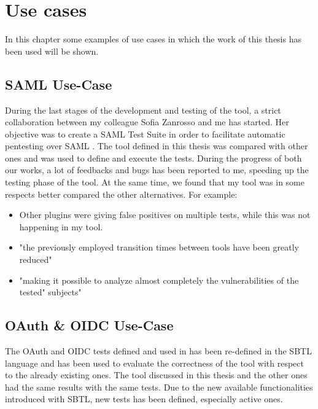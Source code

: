 \chapter{Use cases}
\label{chap:Use_cases}
In this chapter some examples of use cases in which the work of this thesis has been used will be shown.

\section{SAML Use-Case}
During the last stages of the development and testing of the tool, a strict collaboration between my colleague Sofia Zanrosso and me has started. Her objective was to create a SAML Test Suite in order to facilitate automatic pentesting over SAML \cite{sofia_zanrosso}. The tool defined in this thesis was compared with other ones and was used to define and execute the tests. During the progress of both our works, a lot of feedbacks and bugs has been reported to me, speeding up the testing phase of the tool. At the same time, we found that my tool was in some respects better compared the other alternatives. For example:
\begin{itemize}
    \item Other plugins were giving false positives on multiple tests, while this was not happening in my tool.
    \item "the previously employed transition times between tools have been greatly reduced"
    \item "making it possible to analyze almost completely the vulnerabilities of the tested" subjects"
\end{itemize}


\section{OAuth \& OIDC Use-Case}    
The \Gls{OAuth} and \Gls{OIDC} tests defined and used in \cite{claudio_grisenti,wendy_barreto} has been re-defined in the SBTL language and has been used to evaluate the correctness of the tool with respect to the already existing ones. The tool discussed in this thesis and the other ones had the same results with the same tests. Due to the new available functionalities introduced with SBTL, new tests has been defined, especially active ones.





